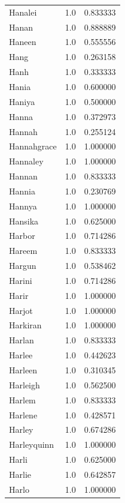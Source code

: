 \documentclass[
  letterpaper,
  DIV=11,
  numbers=noendperiod]{scrreprt}
\begin{document}
\begin{tabular}{lrr}
Hanalei         &   1.0 &   0.833333 \\
Hanan           &   1.0 &   0.888889 \\
Haneen          &   1.0 &   0.555556 \\
Hang            &   1.0 &   0.263158 \\
Hanh            &   1.0 &   0.333333 \\
Hania           &   1.0 &   0.600000 \\
Haniya          &   1.0 &   0.500000 \\
Hanna           &   1.0 &   0.372973 \\
Hannah          &   1.0 &   0.255124 \\
Hannahgrace     &   1.0 &   1.000000 \\
Hannaley        &   1.0 &   1.000000 \\
Hannan          &   1.0 &   0.833333 \\
Hannia          &   1.0 &   0.230769 \\
Hannya          &   1.0 &   1.000000 \\
Hansika         &   1.0 &   0.625000 \\
Harbor          &   1.0 &   0.714286 \\
Hareem          &   1.0 &   0.833333 \\
Hargun          &   1.0 &   0.538462 \\
Harini          &   1.0 &   0.714286 \\
Harir           &   1.0 &   1.000000 \\
Harjot          &   1.0 &   1.000000 \\
Harkiran        &   1.0 &   1.000000 \\
Harlan          &   1.0 &   0.833333 \\
Harlee          &   1.0 &   0.442623 \\
Harleen         &   1.0 &   0.310345 \\
Harleigh        &   1.0 &   0.562500 \\
Harlem          &   1.0 &   0.833333 \\
Harlene         &   1.0 &   0.428571 \\
Harley          &   1.0 &   0.674286 \\
Harleyquinn     &   1.0 &   1.000000 \\
Harli           &   1.0 &   0.625000 \\
Harlie          &   1.0 &   0.642857 \\
Harlo           &   1.0 &   1.000000 \\

\end{tabular}
\end{document}
